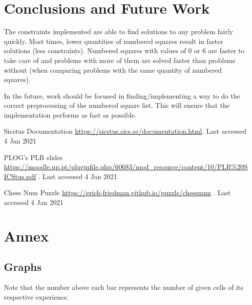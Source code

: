 \documentclass[runningheads]{llncs}
\begin{document}
\section{Conclusions and Future Work}
The constraints implemented are able to find solutions to any problem fairly
quickly. Most times, lower quantities of numbered squares result in faster
solutions (less constraints). Numbered squares with values of 0 or 6 are
faster to take care of and problems with more of them are solved faster than
problems without (when comparing problems with the same quantity of numbered squares).

In the future, work should be focused in finding/implementing a way to do the
correct preprocessing of the numbered square list. This will ensure that the
implementation performs as fast as possible.

\begin{thebibliography}{8}
    Sicstus Documentation
        \href{https://sicstus.sics.se/documentation.html}{https://sicstus.sics.se/documentation.html}.
        Last accessed 4 Jan 2021

    PLOG's PLR slides 
    \href{https://moodle.up.pt/pluginfile.php/60683/mod\_resource/content/10/PLR\%20SICStus.pdf}{https://moodle.up.pt/pluginfile.php/60683/mod\_resource/content/10/PLR\%20SICStus.pdf}
    . Last accessed 4 Jan 2021

    Chess Num Puzzle 
    \href{https://erich-friedman.github.io/puzzle/chessnum}{https://erich-friedman.github.io/puzzle/chessnum}
    . Last accessed 4 Jan 2021
\end{thebibliography}

\section{Annex}
\subsection{Graphs}
Note that the number above each bar represents the number of given cells of
its respective experience.

\end{document}
